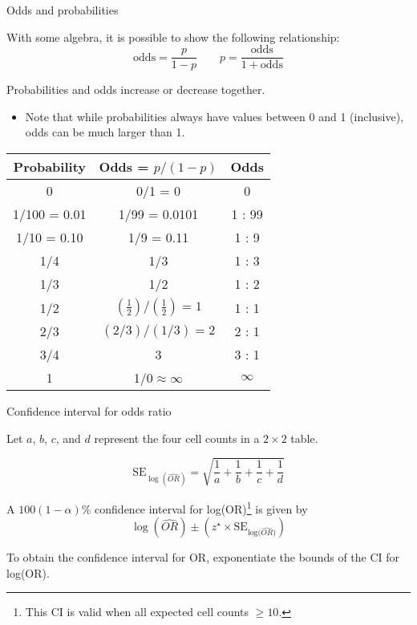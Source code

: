 \documentclass[
  ignorenonframetext,
  aspectratio=169]{beamer}
\providecommand{\tightlist}{%
  \setlength{\itemsep}{0pt}\setlength{\parskip}{0pt}}
\begin{document}
\begin{frame}{Odds and probabilities}
\protect\hypertarget{odds-and-probabilities}{}
\small

With some algebra, it is possible to show the following relationship:
\[\text{odds} = \dfrac{p}{1-p} \qquad p = \frac{\text{odds}}{1 + \text{odds}}\]

Probabilities and odds increase or decrease together.

\begin{itemize}
\tightlist
\item
  Note that while probabilities always have values between 0 and 1
  (inclusive), odds can be much larger than 1.
\end{itemize}

\footnotesize

\begin{table}
\centering
\begin{tabular}{c|c|c}
\textbf{Probability} & \textbf{Odds} = $p/(1-p)$ &\textbf{Odds}\\
\hline
0 &0/1 = 0 &0 \\
1/100 = 0.01 &1/99 = 0.0101 &1 : 99 \\
1/10 = 0.10 & 1/9 = 0.11 & 1 : 9 \\
1/4 &1/3 &1 : 3 \\
1/3 &1/2 &1 : 2 \\
1/2 &$(\frac{1}{2})/(\frac{1}{2})=1$ &1 : 1 \\
2/3 &$(2/3)/(1/3)=2$ &2 : 1 \\
3/4 &3 &3 : 1 \\
1 &1/$0\approx\infty$ &$\infty$ \\
\end{tabular}
\end{table}
\end{frame}

\begin{frame}{Confidence interval for odds ratio}
\protect\hypertarget{confidence-interval-for-odds-ratio}{}
\small

Let \(a\), \(b\), \(c\), and \(d\) represent the four cell counts in a
\(2 \times 2\) table.

\[\text{SE}_{\log(\widehat{OR})} = \sqrt{\frac{1}{a} + \frac{1}{b} + \frac{1}{c} + \frac{1}{d}}\]

A \(100(1-\alpha)\)\% confidence interval for
log(OR)\footnote{This CI is valid when all expected cell counts $\geq 10$.}
is given by
\[\log(\widehat{OR}) \pm \left( z^\star \times  \text{SE}_{\text{log($\widehat{OR}$)}} \right) \]

To obtain the confidence interval for OR, exponentiate the bounds of the
CI for log(OR).
\end{frame}
\end{document}
